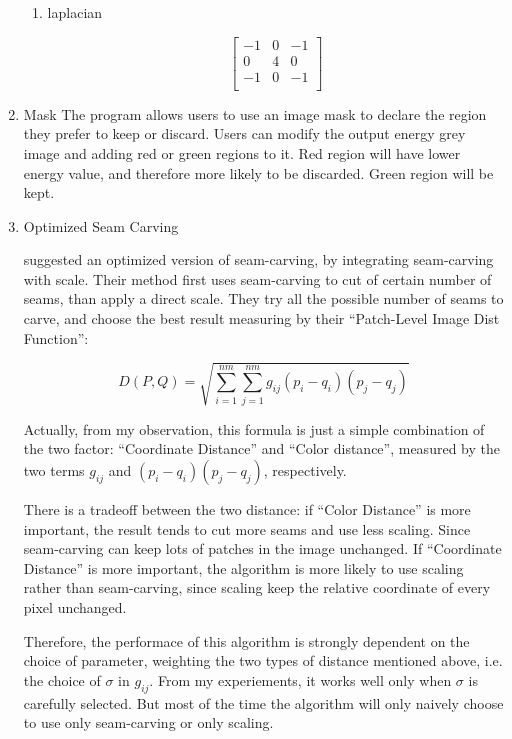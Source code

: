 \begin{enumerate}
\begin{enumerate}
      \item laplacian

        \[ \begin{bmatrix}
          -1 & 0 & -1\\
          0 & 4 & 0 \\
          -1 & 0 & -1\\
          \end{bmatrix}\]
\end{enumerate}

\item Mask
  The program allows users to use an image mask to declare the region they
  prefer to keep or discard. Users can modify the output energy grey image
  and adding red or green regions to it. Red region will have lower energy value,
  and therefore more likely to be discarded. Green region will be kept.

  \item Optimized Seam Carving

    \cite{sco} suggested an optimized version of seam-carving, by integrating seam-carving with scale.
    Their method first uses seam-carving to cut of certain number of seams,
    than apply a direct scale. They try all the possible number of seams to carve, and
    choose the best result measuring by their ``Patch-Level Image Dist Function'':

    \[ D(P, Q) = \sqrt{\sum_{i=1}^{nm}\sum_{j=1}^{nm}g_{ij}(p_i-q_i)(p_j-q_j)}\]

    Actually, from my observation, this formula is just a simple combination of the two factor: ``Coordinate Distance'' and
    ``Color distance'', measured by the two terms $g_{ij}$ and $(p_i-q_i)(p_j-q_j)$, respectively.

    There is a tradeoff between the two distance:
    if ``Color Distance'' is more important, the result tends to cut more seams and use less scaling.
    Since seam-carving can keep lots of patches in the image unchanged.
    If ``Coordinate Distance'' is more important, the algorithm is more likely to use scaling rather
    than seam-carving, since scaling keep the relative coordinate of every pixel unchanged.

    Therefore, the performace of this algorithm is strongly dependent on the choice of parameter,
    weighting the two types of distance mentioned above, i.e. the choice of $\sigma$ in $ g_{ij}$.
    From my experiements, it works well only when $\sigma$ is carefully selected. But most of the
    time the algorithm will only naively choose to use only seam-carving or only scaling.


\end{enumerate}
